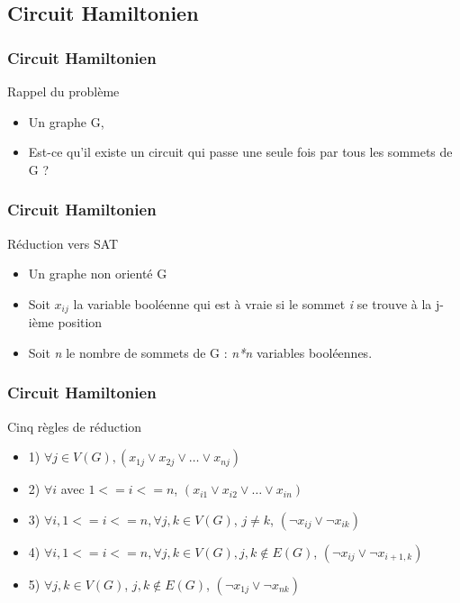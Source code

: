 

\subsection{Circuit Hamiltonien}

\begin{frame}
\frametitle{Circuit Hamiltonien}
\begin{block}{Rappel du probl\`eme}
  \begin{itemize}
  \item Un graphe G,
  \item Est-ce qu'il existe un circuit qui passe une seule fois par
    tous les sommets de G ?
  \end{itemize}
\end{block}
\end{frame}

\begin{frame}
\frametitle{Circuit Hamiltonien}
\begin{block}{R\'eduction vers SAT}
  \begin{itemize}
  \item Un graphe non orient\'e G
  \item Soit \textit{$x_{ij}$} la variable bool\'eenne qui est \`a
    vraie si le sommet \textit{i} se trouve \`a la j-i\`eme position
  \item Soit \textit{n} le nombre de sommets de G : \textit{n*n}
    variables bool\'eennes.
  \end{itemize}
\end{block}
\end{frame}

\begin{frame}
\frametitle{Circuit Hamiltonien}
\begin{block}{Cinq r\`egles de r\'eduction}
  \begin{itemize}
  \item 1) $\forall j \in V(G), (x_{1j} \vee x_{2j} \vee \ldots \vee
    x_{nj})$
  \item 2) $\forall i$ avec $1 <= i <= n$, $(x_{i1} \vee x_{i2} \vee
    \ldots \vee x_{in})$
  \item 3) $\forall i, 1 <= i <= n, \forall {j, k} \in V(G)$, $j \ne
    k$, $(\neg x_{ij} \vee \neg x_{ik})$
  \item 4) $\forall i, 1 <= i <= n, \forall {j, k} \in V(G), {j,k}
    \notin E(G)$, $(\neg x_{ij} \vee \neg x_{i+1,k})$
  \item 5) $\forall j,k \in V(G)$, ${j,k} \notin E(G)$, $(\neg x_{1j}
    \vee \neg x_{nk})$
  \end{itemize}
\end{block}
\end{frame}

